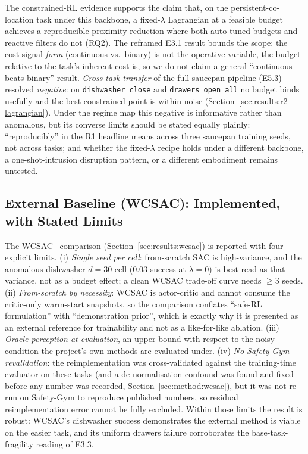 \documentclass[11pt,a4paper]{report}
\begin{document}
The constrained-RL evidence supports the claim that, on the
persistent-co-location task under this backbone, a fixed-$\lambda$
Lagrangian at a feasible budget achieves a reproducible proximity
reduction where both auto-tuned budgets and reactive filters do not
(RQ2). The reframed E3.1 result bounds the scope: the cost-signal
\emph{form} (continuous vs.\ binary) is not the operative variable,
the budget relative to the task's inherent cost is, so we do not
claim a general ``continuous beats binary'' result. \emph{Cross-task
transfer} of the full saucepan pipeline (E5.3) resolved
\emph{negative}: on \texttt{dishwasher\_close} and
\texttt{drawers\_open\_all} no budget binds usefully and the best
constrained point is within noise
(Section~\ref{sec:results:r2-lagrangian}). Under the regime map this
negative is informative rather than anomalous, but its converse
limits should be stated equally plainly: ``reproducibly'' in the R1
headline means across three saucepan training seeds, not across
tasks; and whether the fixed-$\lambda$ recipe holds under a
different backbone, a one-shot-intrusion disruption pattern, or a
different embodiment remains untested.

\subsection{External Baseline (WCSAC): Implemented, with Stated Limits}
\label{sec:disc:wcsac-honest}

The WCSAC~\cite{yang2021wcsac} comparison
(Section~\ref{sec:results:wcsac}) is reported with four explicit
limits. (i) \emph{Single seed per cell}: from-scratch SAC is
high-variance, and the anomalous dishwasher $d{=}30$ cell ($0.03$
success at $\lambda = 0$) is best read as that variance, not as a
budget effect; a clean WCSAC trade-off curve needs $\geq 3$ seeds.
(ii) \emph{From-scratch by necessity}: WCSAC is actor-critic and
cannot consume the critic-only warm-start snapshots, so the
comparison conflates ``safe-RL formulation'' with ``demonstration
prior'', which is exactly why it is presented as an external
reference for trainability and not as a like-for-like ablation.
(iii) \emph{Oracle perception at evaluation}, an upper bound with
respect to the noisy condition the project's own methods are
evaluated under. (iv) \emph{No Safety-Gym revalidation}: the
reimplementation was cross-validated against the training-time
evaluator on these tasks (and a de-normalisation confound was found
and fixed before any number was recorded,
Section~\ref{sec:method:wcsac}), but it was not re-run on Safety-Gym
to reproduce published numbers, so residual reimplementation error
cannot be fully excluded. Within those limits the result is robust:
WCSAC's dishwasher success demonstrates the external method is
viable on the easier task, and its uniform drawers failure
corroborates the base-task-fragility reading of E3.3.
\end{document}
